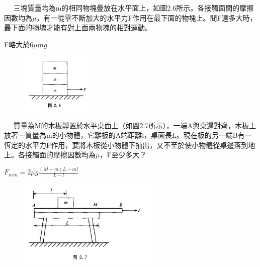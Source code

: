 \documentclass[cn,10pt,math=newtx,chinesefont=founder]{../elegantbook}
\begin{document}
\newpage


\begin{example}　
    三塊質量均為m的相同物塊疊放在水平面上，如圖2.6所示。各接觸面間的摩擦因數均為$\mu$，有一從零不斷加大的水平力F作用在最下面的物塊上。問F達多大時，最下面的物塊才能有對上面兩物塊的相對運動。
    
    \rightline{[2.1.6]}
\end{example}

\begin{solution}
F略大於$6\mu mg$
\end{solution}

\begin{figure}[htbp]
\flushright
\includegraphics[width=0.3\textwidth]{image/2.6.JPG}
\end{figure}

\newpage


\begin{example}　
    質量為M的木板靜置於水平桌面上（如圖2.7所示），一端A與桌邊對齊，木板上放著一質量為m的小物體，它離板的A端距離l，桌面長L。現在板的另一端B有一恆定的水平力F作用，要將木板從小物體下抽出，又不至於使小物體從桌邊落到地上。各接觸面的摩擦因數均為$\mu$，F至少多大？
    
    \rightline{[2.1.7]}
\end{example}

\begin{solution}
$F_{min} = 2\mu g\frac{(M+m)L-ml}{L-l}$
\end{solution}

\begin{figure}[htbp]
\flushright
\includegraphics[width=0.6\textwidth]{image/2.7.JPG}
\end{figure}
\end{document}
